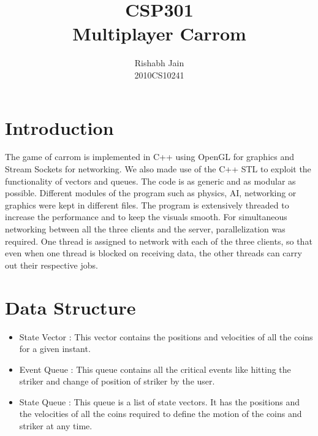 \documentclass[11pt,a4paper,oneside]{report}
\begin{document}
\begin{titlepage}


\title{CSP301 \\ Multiplayer Carrom}
\author{Rishabh Jain \\ 2010CS10241}
\date{}

\maketitle



\end{titlepage}

\setcounter{chapter}{1}

\section{Introduction}
The game of carrom is implemented in C++ using OpenGL for graphics and Stream Sockets for networking. We also made use of the C++ STL to exploit the functionality of vectors and queues. The code is as generic and as modular as possible. Different modules of the program such as physics, AI, networking or graphics were kept in different files. The program is extensively threaded to increase the performance and to keep the visuals smooth. For simultaneous networking between all the three clients and the server, parallelization was required. One thread is assigned to network with each of the three clients, so that even when one thread is blocked on receiving data, the other threads can carry out their respective jobs.

\section{Data Structure}

\begin{itemize}
\item{State Vector : This vector contains the positions and velocities of all the coins for a given instant.
}
\item{Event Queue : This queue contains all the critical events like hitting the striker and change of position of striker by the user.
}
\item{State Queue : This queue is a list of state vectors. It has the positions and the velocities of all the coins required to define the motion of the coins and striker at any time.}

\end{itemize}
\end{document}

